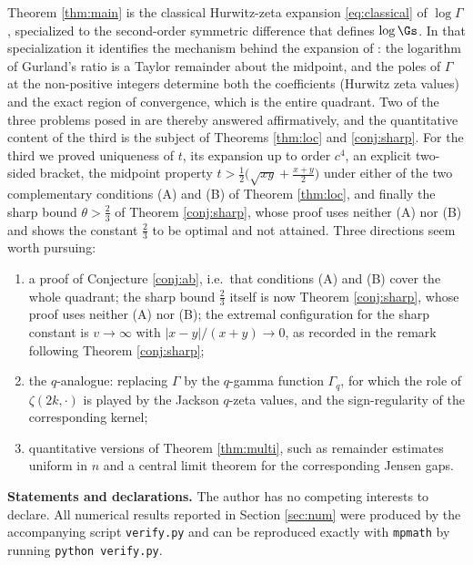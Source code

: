 Theorem \ref{thm:main} is the classical Hurwitz-zeta expansion \eqref{eq:classical} of
$\log\Gamma$, specialized to the second-order symmetric difference that defines
$\log\Gs$. In that specialization it identifies the mechanism behind the expansion of
\cite{Wisniewska25}: the logarithm of Gurland's ratio is a Taylor remainder about the
midpoint, and the poles of $\Gamma$ at the non-positive integers determine both the
coefficients (Hurwitz zeta values) and the exact region of convergence, which is the entire
quadrant. Two of the three problems posed in \cite{Wisniewska25} are thereby answered
affirmatively, and the quantitative content of the third is the subject of
Theorems \ref{thm:loc} and \ref{conj:sharp}. For the third we proved
uniqueness of $t$, its expansion up to order $c^{4}$, an explicit two-sided bracket, the
midpoint property $t>\frac12\big(\sqrt{xy}+\frac{x+y}{2}\big)$ under either of the two
complementary conditions (A) and (B) of Theorem \ref{thm:loc}, and finally the sharp bound
$\theta>\frac23$ of Theorem \ref{conj:sharp}, whose proof uses neither (A) nor (B) and shows
the constant $\frac23$ to be optimal and not attained. Three directions seem worth
pursuing:
\begin{enumerate}
\item[(a)] a proof of Conjecture \ref{conj:ab}, i.e.\ that conditions (A) and (B) cover
  the whole quadrant; the sharp bound $\frac23$ itself is now Theorem \ref{conj:sharp},
  whose proof uses neither (A) nor (B); the extremal configuration for the sharp constant is
  $v\to\infty$ with $|x-y|/(x+y)\to0$, as recorded in the remark following
  Theorem \ref{conj:sharp};
\item[(b)] the $q$-analogue: replacing $\Gamma$ by the $q$-gamma function $\Gamma_{q}$,
  for which the role of $\zeta(2k,\cdot)$ is played by the Jackson $q$-zeta values, and the
  sign-regularity of the corresponding kernel;
\item[(c)] quantitative versions of Theorem \ref{thm:multi}, such as remainder estimates
  uniform in $n$ and a central limit theorem for the corresponding Jensen gaps.
\end{enumerate}

\medskip
\noindent\textbf{Statements and declarations.} The author has no competing interests to
declare. All numerical results reported in Section \ref{sec:num} were produced by the
accompanying script \texttt{verify.py} and can be reproduced exactly with \texttt{mpmath}
by running \texttt{python verify.py}.

